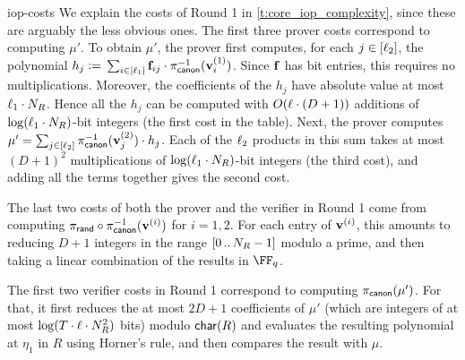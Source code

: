 \begin{lncsappendix}{iop-costs}
 We explain the costs of Round 1 in \cref{t:core_iop_complexity}, since these are arguably the less obvious ones. The first three prover costs correspond to computing $\mu'$. To obtain $\mu'$, the prover first computes, for each $j\in [\ell_2]$, the polynomial $h_j{\;\vcentcolon=\;} \sum_{i\in [\ell_1]} \mathbf{f}_{ij}\cdot \pi_{\mathsf{canon}}^{-1}(\mathbf{v}^{(1)}_i)$. Since $\mathbf{f}$ has bit entries, this requires no multiplications. Moreover, the coefficients of the $h_j$ have absolute value at most $\ell_1\cdot N_R$. Hence all the $h_j$ can be computed with $O(\ell\cdot (D+1))$ additions of $\log(\ell_1\cdot N_R)$-bit integers (the first cost in the table). Next, the prover computes $\mu'=\sum_{j\in [\ell_2]}\pi_{\mathsf{canon}}^{-1}(\mathbf{v}^{(2)}_j)\cdot h_j$. Each of the $\ell_2$ products in this sum takes at most $(D+1)^{2}$ multiplications of $\log(\ell_1\cdot N_R)$-bit integers (the third cost), and adding all the terms together gives the second cost.

The last two costs of both the prover and the verifier in Round 1 come from computing $\pi_{\mathsf{rand}}\circ \pi_{\mathsf{canon}}^{-1}(\mathbf{v}^{(i)})$ for $i=1,2$. For each entry of $\mathbf{v}^{(i)}$, this amounts to reducing $D+1$ integers in the range $[0 \, .. \, N_R-1]$ modulo a prime, and then taking a linear combination of the results in $\FF_q$. 



 The first two verifier costs in Round 1 correspond to computing $\pi_{\mathsf{canon}}(\mu')$. For that, it first reduces the at most $2D+1$ coefficients of $\mu'$ (which are integers of at most $\log(T\cdot \ell\cdot N_R^2)$ bits) modulo $\mathsf{char}(R)$ and evaluates the resulting polynomial at $\eta_1$ in $R$ using Horner's rule, and then compares the result with $\mu$. 
 

\end{lncsappendix}
